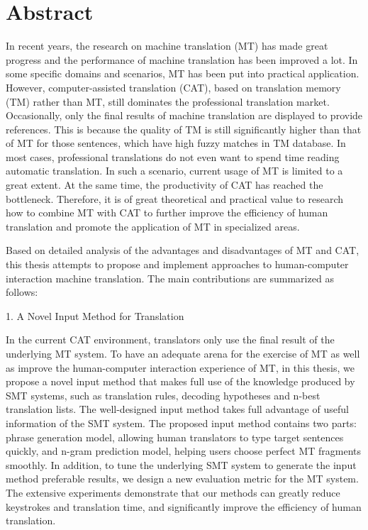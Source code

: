 \chapter{Abstract}%
In recent years, the research on machine translation (MT) has made great progress and the performance of machine translation has been improved a lot. In some specific domains and scenarios, MT has been put into practical application. However, computer-assisted translation (CAT), based on translation memory (TM) rather than MT, still dominates the professional translation market. Occasionally, only the final results of machine translation are displayed to provide references. This is because the quality of TM is still significantly higher than that of MT for those sentences, which have high fuzzy matches in TM database. In most cases, professional translations do not even want to spend time reading automatic translation. In such a scenario, current usage of MT is limited to a great extent. At the same time, the productivity of CAT has reached the bottleneck. Therefore, it is of great theoretical and practical value to research how to combine MT with CAT to further improve the efficiency of human translation and promote the application of MT in specialized areas.

Based on detailed analysis of the advantages and disadvantages of MT and CAT, this thesis attempts to propose and implement approaches to human-computer interaction machine translation. The main contributions are summarized as follows:

1. A Novel Input Method for Translation

In the current CAT environment, translators only use the final result of the underlying MT system. To have an adequate arena for the exercise of MT as well as improve the human-computer interaction experience of MT, in this thesis, we propose a novel input method that makes full use of the knowledge produced by SMT systems, such as translation rules, decoding hypotheses and n-best translation lists. The well-designed input method takes full advantage of useful information of the SMT system. The proposed input method contains two parts: phrase generation model, allowing human translators to type target sentences quickly, and n-gram prediction model, helping users choose perfect MT fragments smoothly. In addition, to tune the underlying SMT system to generate the input method preferable results, we design a new evaluation metric for the MT system. The extensive experiments demonstrate that our methods can greatly reduce keystrokes and translation time, and significantly improve the efficiency of human translation.

